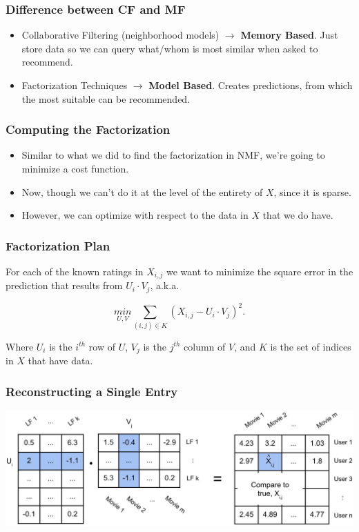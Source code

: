 \documentclass{beamer}
\begin{document}
\begin{frame}
  \frametitle{Difference between CF and MF}
  \begin{itemize}
    \item Collaborative Filtering (neighborhood models) $\rightarrow$ \textbf{Memory Based}. Just store data so we can query what/whom is most similar when asked to recommend. \vspace{2mm}
    \item Factorization Techniques $\rightarrow$ \textbf{Model Based}. Creates predictions, from which the most suitable can be recommended.
  \end{itemize}
\end{frame}

\begin{frame}
  \frametitle{Computing the Factorization}
  \begin{itemize}
    \item Similar to what we did to find the factorization in NMF, we're going to minimize a cost function. \vspace{2mm}
    \item Now, though we can't do it at the level of the entirety of $X$, since it is sparse. \vspace{2mm}
    \item However, we can optimize with respect to the data in $X$ that we do have.
  \end{itemize}
\end{frame}

\begin{frame}
  \frametitle{Factorization Plan}
    For each of the known ratings in $X_{i,j}$ we want to minimize the square error in the prediction that results from $U_i \cdot V_j$, a.k.a. 

    $$ \underset{U,V}{min} \sum\limits_{(i,j) \in K} (X_{i,j} - U_i \cdot V_j)^2. $$
    
    Where $U_i$ is the $i^{th}$ row of $U$, $V_j$ is the $j^{th}$ column of $V$, and $K$ is the set of indices in $X$ that have data.
\end{frame}

\begin{frame}
  \frametitle{Reconstructing a Single Entry}
  \includegraphics[width=\textwidth]{images/reconstruction_cell.png} \vspace{4mm}
\end{frame}
\end{document}
